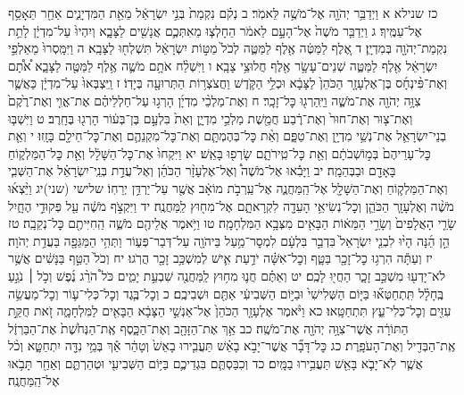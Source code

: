 \documentclass[twoside, openany, parskip=half, 11pt]{book}
\begin{document}
כז שנילא א וַיְדַבֵּ֥ר יְהֹוָ֖ה אֶל־מֹשֶׁ֥ה לֵּאמֹֽר׃ ב נְקֹ֗ם נִקְמַת֙ בְּנֵ֣י יִשְׂרָאֵ֔ל מֵאֵ֖ת הַמִּדְיָנִ֑ים אַחַ֖ר תֵּאָסֵ֥ף אֶל־עַמֶּֽיךָ׃ ג וַיְדַבֵּ֤ר מֹשֶׁה֙ אֶל־הָעָ֣ם לֵאמֹ֔ר הֵחָלְצ֧וּ מֵאִתְּכֶ֛ם אֲנָשִׁ֖ים לַצָּבָ֑א וְיִהְיוּ֙ עַל־מִדְיָ֔ן לָתֵ֥ת נִקְמַת־יְהֹוָ֖ה בְּמִדְיָֽן׃ ד אֶ֚לֶף לַמַּטֶּ֔ה אֶ֖לֶף לַמַּטֶּ֑ה לְכֹל֙ מַטּ֣וֹת יִשְׂרָאֵ֔ל תִּשְׁלְח֖וּ לַצָּבָֽא׃ ה וַיִּמָּֽסְרוּ֙ מֵאַלְפֵ֣י יִשְׂרָאֵ֔ל אֶ֖לֶף לַמַּטֶּ֑ה שְׁנֵים־עָשָׂ֥ר אֶ֖לֶף חֲלוּצֵ֥י צָבָֽא׃ ו וַיִּשְׁלַ֨ח אֹתָ֥ם מֹשֶׁ֛ה אֶ֥לֶף לַמַּטֶּ֖ה לַצָּבָ֑א אֹ֠תָ֠ם וְאֶת־פִּ֨ינְחָ֜ס בֶּן־אֶלְעָזָ֤ר הַכֹּהֵן֙ לַצָּבָ֔א וּכְלֵ֥י הַקֹּ֛דֶשׁ וַחֲצֹצְר֥וֹת הַתְּרוּעָ֖ה בְּיָדֽוֹ׃ ז וַֽיִּצְבְּאוּ֙ עַל־מִדְיָ֔ן כַּאֲשֶׁ֛ר צִוָּ֥ה יְהֹוָ֖ה אֶת־מֹשֶׁ֑ה וַיַּֽהַרְג֖וּ כׇּל־זָכָֽר׃ ח וְאֶת־מַלְכֵ֨י מִדְיָ֜ן הָרְג֣וּ עַל־חַלְלֵיהֶ֗ם אֶת־אֱוִ֤י וְאֶת־רֶ֙קֶם֙ וְאֶת־צ֤וּר וְאֶת־חוּר֙ וְאֶת־רֶ֔בַע חֲמֵ֖שֶׁת מַלְכֵ֣י מִדְיָ֑ן וְאֵת֙ בִּלְעָ֣ם בֶּן־בְּע֔וֹר הָרְג֖וּ בֶּחָֽרֶב׃ ט וַיִּשְׁבּ֧וּ בְנֵי־יִשְׂרָאֵ֛ל אֶת־נְשֵׁ֥י מִדְיָ֖ן וְאֶת־טַפָּ֑ם וְאֵ֨ת כׇּל־בְּהֶמְתָּ֧ם וְאֶת־כׇּל־מִקְנֵהֶ֛ם וְאֶת־כׇּל־חֵילָ֖ם בָּזָֽזוּ׃ י וְאֵ֤ת כׇּל־עָרֵיהֶם֙ בְּמ֣וֹשְׁבֹתָ֔ם וְאֵ֖ת כׇּל־טִֽירֹתָ֑ם שָׂרְפ֖וּ בָּאֵֽשׁ׃ יא וַיִּקְחוּ֙ אֶת־כׇּל־הַשָּׁלָ֔ל וְאֵ֖ת כׇּל־הַמַּלְק֑וֹחַ בָּאָדָ֖ם וּבַבְּהֵמָֽה׃ יב וַיָּבִ֡אוּ אֶל־מֹשֶׁה֩ וְאֶל־אֶלְעָזָ֨ר הַכֹּהֵ֜ן וְאֶל־עֲדַ֣ת בְּנֵֽי־יִשְׂרָאֵ֗ל אֶת־הַשְּׁבִ֧י וְאֶת־הַמַּלְק֛וֹחַ וְאֶת־הַשָּׁלָ֖ל אֶל־הַֽמַּחֲנֶ֑ה אֶל־עַֽרְבֹ֣ת מוֹאָ֔ב אֲשֶׁ֖ר עַל־יַרְדֵּ֥ן יְרֵחֽוֹ׃
שלישי (שני)יג וַיֵּ֨צְא֜וּ מֹשֶׁ֨ה וְאֶלְעָזָ֧ר הַכֹּהֵ֛ן וְכׇל־נְשִׂיאֵ֥י הָעֵדָ֖ה לִקְרָאתָ֑ם אֶל־מִח֖וּץ לַֽמַּחֲנֶֽה׃ יד וַיִּקְצֹ֣ף מֹשֶׁ֔ה עַ֖ל פְּקוּדֵ֣י הֶחָ֑יִל שָׂרֵ֤י הָאֲלָפִים֙ וְשָׂרֵ֣י הַמֵּא֔וֹת הַבָּאִ֖ים מִצְּבָ֥א הַמִּלְחָמָֽה׃ טו וַיֹּ֥אמֶר אֲלֵיהֶ֖ם מֹשֶׁ֑ה הַֽחִיִּיתֶ֖ם כׇּל־נְקֵבָֽה׃ טז הֵ֣ן הֵ֜נָּה הָי֨וּ לִבְנֵ֤י יִשְׂרָאֵל֙ בִּדְבַ֣ר בִּלְעָ֔ם לִמְסׇר־מַ֥עַל בַּיהֹוָ֖ה עַל־דְּבַר־פְּע֑וֹר וַתְּהִ֥י הַמַּגֵּפָ֖ה בַּעֲדַ֥ת יְהֹוָה׃ יז וְעַתָּ֕ה הִרְג֥וּ כׇל־זָכָ֖ר בַּטָּ֑ף וְכׇל־אִשָּׁ֗ה יֹדַ֥עַת אִ֛ישׁ לְמִשְׁכַּ֥ב זָכָ֖ר הֲרֹֽגוּ׃ יח וְכֹל֙ הַטַּ֣ף בַּנָּשִׁ֔ים אֲשֶׁ֥ר לֹא־יָדְע֖וּ מִשְׁכַּ֣ב זָכָ֑ר הַחֲי֖וּ לָכֶֽם׃ יט וְאַתֶּ֗ם חֲנ֛וּ מִח֥וּץ לַֽמַּחֲנֶ֖ה שִׁבְעַ֣ת יָמִ֑ים כֹּל֩ הֹרֵ֨ג נֶ֜פֶשׁ וְכֹ֣ל ׀ נֹגֵ֣עַ בֶּֽחָלָ֗ל תִּֽתְחַטְּא֞וּ בַּיּ֤וֹם הַשְּׁלִישִׁי֙ וּבַיּ֣וֹם הַשְּׁבִיעִ֔י אַתֶּ֖ם וּשְׁבִיכֶֽם׃ כ וְכׇל־בֶּ֧גֶד וְכׇל־כְּלִי־ע֛וֹר וְכׇל־מַעֲשֵׂ֥ה עִזִּ֖ים וְכׇל־כְּלִי־עֵ֑ץ תִּתְחַטָּֽאוּ׃
כא וַיֹּ֨אמֶר אֶלְעָזָ֤ר הַכֹּהֵן֙ אֶל־אַנְשֵׁ֣י הַצָּבָ֔א הַבָּאִ֖ים לַמִּלְחָמָ֑ה זֹ֚את חֻקַּ֣ת הַתּוֹרָ֔ה אֲשֶׁר־צִוָּ֥ה יְהֹוָ֖ה אֶת־מֹשֶֽׁה׃ כב אַ֥ךְ אֶת־הַזָּהָ֖ב וְאֶת־הַכָּ֑סֶף אֶֽת־הַנְּחֹ֙שֶׁת֙ אֶת־הַבַּרְזֶ֔ל אֶֽת־הַבְּדִ֖יל וְאֶת־הָעֹפָֽרֶת׃ כג כׇּל־דָּבָ֞ר אֲשֶׁר־יָבֹ֣א בָאֵ֗שׁ תַּעֲבִ֤ירוּ בָאֵשׁ֙ וְטָהֵ֔ר אַ֕ךְ בְּמֵ֥י נִדָּ֖ה יִתְחַטָּ֑א וְכֹ֨ל אֲשֶׁ֧ר לֹֽא־יָבֹ֛א בָּאֵ֖שׁ תַּעֲבִ֥ירוּ בַמָּֽיִם׃ כד וְכִבַּסְתֶּ֧ם בִּגְדֵיכֶ֛ם בַּיּ֥וֹם הַשְּׁבִיעִ֖י וּטְהַרְתֶּ֑ם וְאַחַ֖ר תָּבֹ֥אוּ אֶל־הַֽמַּחֲנֶֽה׃
\end{document}
